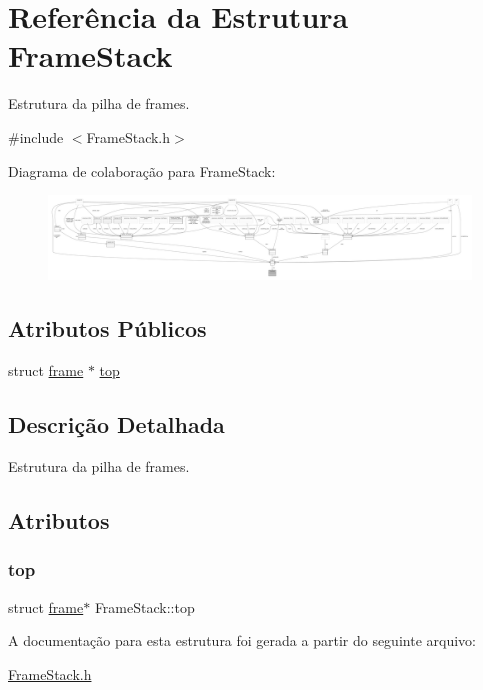 \hypertarget{structFrameStack}{}\section{Referência da Estrutura Frame\+Stack}
\label{structFrameStack}


Estrutura da pilha de frames.  




{\ttfamily \#include $<$Frame\+Stack.\+h$>$}



Diagrama de colaboração para Frame\+Stack\+:\nopagebreak
\begin{figure}[H]
\begin{center}
\leavevmode
\includegraphics[width=350pt]{structFrameStack__coll__graph}
\end{center}
\end{figure}
\subsection*{Atributos Públicos}
\begin{DoxyCompactItemize}
\item 
struct \hyperlink{structframe}{frame} $\ast$ \hyperlink{structFrameStack_a0b30458d8eb5565c6fa8db0cb4b4bebd}{top}
\end{DoxyCompactItemize}


\subsection{Descrição Detalhada}
Estrutura da pilha de frames. 

\subsection{Atributos}
\mbox{\label{structFrameStack_a0b30458d8eb5565c6fa8db0cb4b4bebd}} 
\subsubsection{\texorpdfstring{top}{top}}
{\footnotesize\ttfamily struct \hyperlink{structframe}{frame}$\ast$ Frame\+Stack\+::top}



A documentação para esta estrutura foi gerada a partir do seguinte arquivo\+:\begin{DoxyCompactItemize}
\item 
\hyperlink{FrameStack_8h}{Frame\+Stack.\+h}\end{DoxyCompactItemize}
